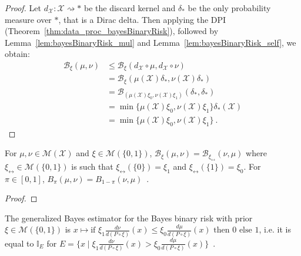 \begin{proof}\leanok
{}
Let $d_{\mathcal X} : \mathcal X \rightsquigarrow *$ be the discard kernel and $\delta_*$ be the only probability measure over $*$, that is a Dirac delta.
Then applying the DPI (Theorem~\ref{thm:data_proc_bayesBinaryRisk}), followed by Lemma~\ref{lem:bayesBinaryRisk_mul} and Lemma~\ref{lem:bayesBinaryRisk_self}, we obtain:
\begin{align*}
\mathcal B_\xi(\mu, \nu)
&\le \mathcal B_\xi(d_{\mathcal X} \circ \mu, d_{\mathcal X} \circ \nu)
\\
&= \mathcal B_\xi(\mu(\mathcal X) \delta_*, \nu(\mathcal X) \delta_*)
\\
&= \mathcal B_{(\mu(\mathcal X) \xi_0, \nu(\mathcal X) \xi_1)}(\delta_*, \delta_*)
\\
&= \min\{\mu(\mathcal X) \xi_0, \nu(\mathcal X) \xi_1\} \delta_*(\mathcal X)
\\
&= \min\{\mu(\mathcal X) \xi_0, \nu(\mathcal X) \xi_1\}
\: .
\end{align*}
\end{proof}

\begin{lemma}
  \label{lem:bayesBinaryRisk_symm}
  \leanok
  For $\mu, \nu \in \mathcal M(\mathcal X)$ and $\xi \in \mathcal M(\{0,1\})$, $\mathcal B_\xi(\mu, \nu) = \mathcal B_{\xi_{\leftrightarrow}}(\nu, \mu)$ where $\xi_{\leftrightarrow} \in \mathcal M(\{0,1\})$ is such that $\xi_{\leftrightarrow}(\{0\}) = \xi_1$ and $\xi_{\leftrightarrow}(\{1\}) = \xi_0$.
  For $\pi \in [0,1]$, $B_\pi(\mu, \nu) = B_{1 - \pi}(\nu, \mu)$~.
\end{lemma}

\begin{proof}\leanok
\uses{}

\end{proof}

\begin{lemma}
  \label{lem:genBayesEstimator_bayesBinaryRisk}
  The generalized Bayes estimator for the Bayes binary risk with prior $\xi \in \mathcal M(\{0,1\})$ is $x \mapsto \text{if } \xi_1\frac{d \nu}{d(P \circ \xi)}(x) \le \xi_0\frac{d \mu}{d(P \circ \xi)}(x) \text{ then } 0 \text{ else } 1$, i.e. it is equal to $\mathbb{I}_E$ for $E = \{x \mid \xi_1\frac{d \nu}{d(P \circ \xi)}(x) > \xi_0\frac{d \mu}{d(P \circ \xi)}(x)\}$~.
\end{lemma}

